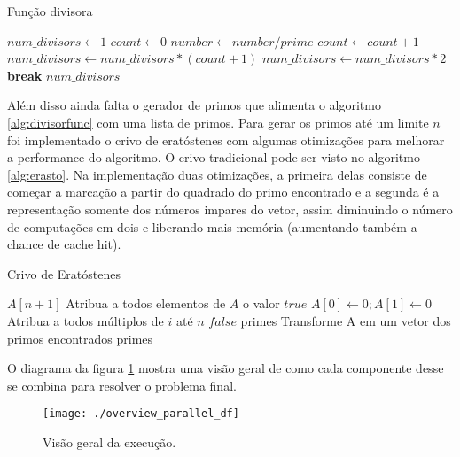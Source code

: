 \documentclass{article}
\begin{document}
\begin{algorithm}
	\caption{Função divisora\label{alg:divisorfunc}}
	\begin{algorithmic}[1]
		\State $num\_divisors\gets 1$
		\label{alg:divisorfunc:for}
		\State $count \gets 0$
		\label{alg:divisorfunc:changes}
		\State $number \gets number/prime$
		\State $count \gets count + 1$
		\EndWhile
		\State $num\_divisors \gets num\_divisors *(count+1)$
		\EndIf
		\label{alg:divisorfunc:end}
		\State $num\_divisors \gets num\_divisors * 2$
		\EndIf
		\State \textbf{break}
		\EndIf
		\EndFor
		\Return $num\_divisors$
		\EndProcedure
	\end{algorithmic}
\end{algorithm}

Além disso ainda falta o gerador de primos que alimenta o algoritmo \ref{alg:divisorfunc} com uma lista de primos. Para gerar os primos até um limite $n$ foi implementado o crivo de eratóstenes com algumas otimizações para melhorar a performance do algoritmo. O crivo tradicional pode ser visto no algoritmo \ref{alg:erasto}. Na implementação duas otimizações, a primeira delas consiste de começar a marcação a partir do quadrado do primo encontrado e a segunda é a representação somente dos números impares do vetor, assim diminuindo o número de computações em dois e liberando mais memória (aumentando também a chance de cache hit).


\begin{algorithm}
	\caption{Crivo de Eratóstenes\label{alg:erasto}}
	\begin{algorithmic}[1]
		\State $A[n+1]$ 
		\State Atribua a todos elementos de $A$ o valor $true$
		\State $A[0]\gets 0; A[1]\gets 0$
		\State Atribua a todos múltiplos de $i$ até $n$ $false$
		\EndIf
		\EndFor
		\State primes \gets Transforme A em um vetor dos primos encontrados
		\Return primes
		\EndProcedure
	\end{algorithmic}
\end{algorithm}

O diagrama da figura \ref{fig:execoverviewserial} mostra uma visão geral de como cada componente desse se combina para resolver o problema final.

\begin{figure}[htp]
    \centering
    \texttt{[image: ./overview\_parallel\_df]}
    \caption{Visão geral da execução.}
    \label{fig:execoverviewserial}
\end{figure}
\end{document}
